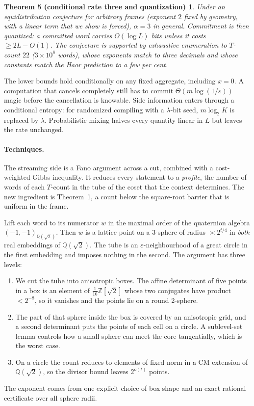 \documentclass[11pt]{article}
\newcommand{\Z}{\mathbb Z}
\newcommand{\Q}{\mathbb Q}
\newtheorem*{thmE}{Theorem 5 (conditional rate three and quantization)}
\begin{document}
\begin{thmE}
Under an equidistribution conjecture for arbitrary frames (exponent $2$ fixed by geometry, with a linear term that we show is forced), $\alpha=3$ in general. Commitment is then quantized: a committed word carries $O(\log L)$ bits unless it costs $\ge2L-O(1)$. The conjecture is supported by exhaustive enumeration to $T$-count $22$ ($3\times10^8$ words), whose exponents match to three decimals and whose constants match the Haar prediction to a few per cent.
\end{thmE}
The lower bounds hold conditionally on any fixed aggregate, including $x=0$. A computation that cancels completely still has to commit $\Theta(m\log(1/\varepsilon))$ magic before the cancellation is knowable. Side information enters through a conditional entropy: for randomized compiling with a $\lambda$-bit seed, $m\log_2K$ is replaced by $\lambda$. Probabilistic mixing halves every quantity linear in $L$ but leaves the rate unchanged.

\paragraph{Techniques.} The streaming side is a Fano argument across a cut, combined with a cost-weighted Gibbs inequality. It reduces every statement to a \emph{profile}, the number of words of each $T$-count in the tube of the coset that the context determines. The new ingredient is Theorem~1, a count below the square-root barrier that is uniform in the frame.

Lift each word to its numerator $w$ in the maximal order of the quaternion algebra $(-1,-1)_{\Q(\sqrt2)}$. Then $w$ is a lattice point on a $3$-sphere of radius $\asymp2^{t/4}$ in \emph{both} real embeddings of $\Q(\sqrt2)$. The tube is an $\varepsilon$-neighbourhood of a great circle in the first embedding and imposes nothing in the second. The argument has three levels:
\begin{enumerate}\setlength\itemsep{0pt}
\item We cut the tube into anisotropic boxes. The affine determinant of five points in a box is an element of $\frac1{16}\Z[\sqrt2]$ whose two conjugates have product $<2^{-8}$, so it vanishes and the points lie on a round $2$-sphere.
\item The part of that sphere inside the box is covered by an anisotropic grid, and a second determinant puts the points of each cell on a circle. A sublevel-set lemma controls how a small sphere can meet the core tangentially, which is the worst case.
\item On a circle the count reduces to elements of fixed norm in a CM extension of $\Q(\sqrt2)$, so the divisor bound leaves $2^{o(t)}$ points.
\end{enumerate}
The exponent comes from one explicit choice of box shape and an exact rational certificate over all sphere radii.
\end{document}

